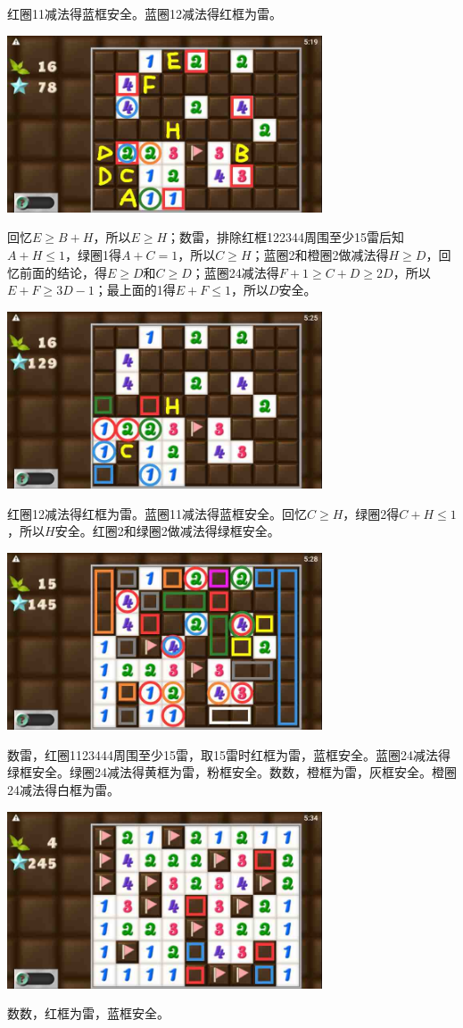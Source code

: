 红圈11减法得蓝框安全。蓝圈12减法得红框为雷。
\begin{center}
    \includegraphics[width=0.7\textwidth]{puzzlelow/250-3.jpg}
\end{center}
回忆$E\ge B+H$，所以$E\ge H$；数雷，排除红框122344周围至少15雷后知$A+H\le 1$，绿圈1得$A+C=1$，所以$C\ge H$；蓝圈2和橙圈2做减法得$H\ge D$，回忆前面的结论，得$E\ge D$和$C\ge D$；蓝圈24减法得$F+1\ge C+D\ge 2D$，所以$E+F\ge 3D-1$；最上面的1得$E+F\le 1$，所以$D$安全。
\begin{center}
    \includegraphics[width=0.7\textwidth]{puzzlelow/250-4.jpg}
\end{center}
红圈12减法得红框为雷。蓝圈11减法得蓝框安全。回忆$C\ge H$，绿圈2得$C+H\le 1$，所以$H$安全。红圈2和绿圈2做减法得绿框安全。
\begin{center}
    \includegraphics[width=0.7\textwidth]{puzzlelow/250-5.jpg}
\end{center}
数雷，红圈1123444周围至少15雷，取15雷时红框为雷，蓝框安全。蓝圈24减法得绿框安全。绿圈24减法得黄框为雷，粉框安全。数数，橙框为雷，灰框安全。橙圈24减法得白框为雷。
\begin{center}
    \includegraphics[width=0.7\textwidth]{puzzlelow/250-6.jpg}
\end{center}
数数，红框为雷，蓝框安全。